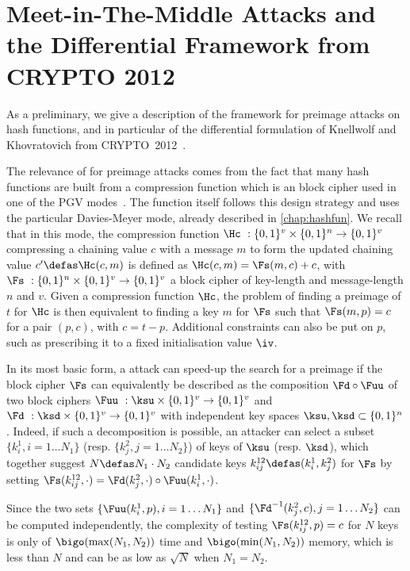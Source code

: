 \section{Meet-in-The-Middle Attacks and the Differential Framework from CRYPTO 2012}
\label{KKFramework}

As a preliminary, we give a description of the \mitm framework for preimage attacks on hash functions,
and in particular of the differential formulation of Knellwolf and Khovratovich from CRYPTO~2012~\cite{DBLP:conf/crypto/KnellwolfK12}.

The relevance of \mitm for preimage attacks comes from the fact that many hash functions are built from a compression
function which is an \ah block cipher used in one of the PGV modes~\cite{PGV93}.
The \shaone function itself follows this design strategy and uses the particular Davies-Meyer mode, already described
in \autoref{chap:hashfun}.
We recall that in this mode, the compression function $\Hc~: \{0, 1\}^v \times \{0, 1\}^n \rightarrow \{0, 1\}^v$ compressing a chaining value $c$ with
a message $m$ to form the updated chaining value $c' \defas \Hc(c, m)$ is defined as $\Hc(c, m) = \Fs(m, c) + c$, with
$\Fs~: \{0, 1\}^n \times \{0, 1\}^v \rightarrow \{0, 1\}^v$ a block cipher of key-length and message-length $n$ and $v$.
Given a compression function $\Hc$,
the problem of finding a preimage of $t$ for $\Hc$ is then equivalent to finding a key $m$ for
$\Fs$
such that $\Fs(m, p) = c$ for a pair $(p, c)$, with $c = t - p$. Additional constraints can also be put on $p$, such as prescribing
it to a fixed initialisation value $\iv$.

In its most basic form, a \mitm attack can speed-up the search for a preimage if the block cipher $\Fs$ can equivalently be
described as the composition $\Fd \circ \Fuu$ of two block ciphers $\Fuu~: \ksu \times \{0, 1\}^v
\rightarrow \{0, 1\}^v$ and $\Fd~: \ksd \times \{0, 1\}^v\rightarrow \{0, 1\}^v$ with independent key spaces $\ksu, \ksd \subset \{0,1\}^n$.
Indeed, if such a decomposition is possible, an attacker can select a subset $\{k^1_i, i = 1\ldots N_1\}$ (resp. $\{k^2_j, j = 1\ldots N_2\}$)
of keys of $\ksu$ (resp. $\ksd$), which
together suggest $N \defas N_1 \cdot N_2$ candidate keys $k^{12}_{ij} \defas (k^1_i, k^2_j)$ for $\Fs$ by setting
$\Fs(k^{12}_{ij},\cdot) = \Fd(k^2_j,\cdot) \circ \Fuu(k^1_i,\cdot)$.

Since the two sets $\{\Fuu(k^1_i, p), i = 1\ldots N_1\}$ and $\{\Fd^{-1}(k^2_j, c), j = 1\ldots N_2\}$ can be computed  independently, the complexity
of testing $\Fs(k^{12}_{ij},p) = c$ for
$N$ keys is only of $\bigo(\max(N_1, N_2))$ time and $\bigo(\min(N_1, N_2))$ memory, which is less than $N$
and can be as low as $\sqrt{N}$ when $N_1 = N_2$.

